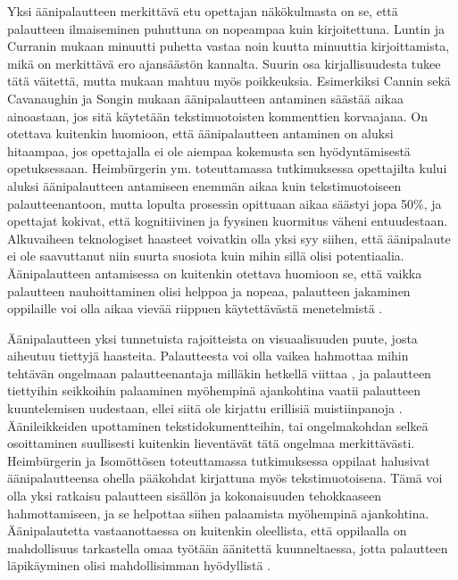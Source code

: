 \documentclass[utf8]{gradu3}
\begin{document}
Yksi äänipalautteen merkittävä etu opettajan näkökulmasta on se, että palautteen ilmaiseminen puhuttuna on nopeampaa kuin kirjoitettuna. Luntin ja Curranin \parencite*{areYouListening} mukaan minuutti puhetta vastaa noin kuutta minuuttia kirjoittamista, mikä on merkittävä ero ajansäästön kannalta. Suurin osa kirjallisuudesta tukee tätä väitettä, mutta mukaan mahtuu myös poikkeuksia. Esimerkiksi Cannin \parencite*{engaging} sekä Cavanaughin ja Songin \parencite*{versus} mukaan äänipalautteen antaminen säästää aikaa ainoastaan, jos sitä käytetään tekstimuotoisten kommenttien korvaajana. On otettava kuitenkin huomioon, että äänipalautteen antaminen on aluksi hitaampaa, jos opettajalla ei ole aiempaa kokemusta sen hyödyntämisestä opetuksessaan. Heimbürgerin ym. \parencite*{academics} toteuttamassa tutkimuksessa opettajilta kului aluksi äänipalautteen antamiseen enemmän aikaa kuin tekstimuotoiseen palautteenantoon, mutta lopulta prosessin opittuaan aikaa säästyi jopa 50\%, ja opettajat kokivat, että kognitiivinen ja fyysinen kuormitus väheni entuudestaan. Alkuvaiheen teknologiset haasteet voivatkin olla yksi syy siihen, että äänipalaute ei ole saavuttanut niin suurta suosiota kuin mihin sillä olisi potentiaalia. Äänipalautteen antamisessa on kuitenkin otettava huomioon se, että vaikka palautteen nauhoittaminen olisi helppoa ja nopeaa, palautteen jakaminen oppilaille voi olla aikaa vievää riippuen käytettävästä menetelmistä \parencite{engaging}.

Äänipalautteen yksi tunnetuista rajoitteista on visuaalisuuden puute, josta aiheutuu tiettyjä haasteita. Palautteesta voi olla vaikea hahmottaa mihin tehtävän ongelmaan palautteenantaja milläkin hetkellä viittaa \parencite{versus}, ja palautteen tiettyihin seikkoihin palaaminen myöhempinä ajankohtina vaatii palautteen kuuntelemisen uudestaan, ellei siitä ole kirjattu erillisiä muistiinpanoja \parencite{evaluating}. Äänileikkeiden upottaminen tekstidokumentteihin, tai ongelmakohdan selkeä osoittaminen suullisesti kuitenkin lieventävät tätä ongelmaa merkittävästi. Heimbürgerin ja Isomöttösen \parencite*{moderating} toteuttamassa tutkimuksessa oppilaat halusivat äänipalautteensa ohella pääkohdat kirjattuna myös tekstimuotoisena. Tämä voi olla yksi ratkaisu palautteen sisällön ja kokonaisuuden tehokkaaseen hahmottamiseen, ja se helpottaa siihen palaamista myöhempinä ajankohtina. Äänipalautetta vastaanottaessa on kuitenkin oleellista, että oppilaalla on mahdollisuus tarkastella omaa työtään äänitettä kuunneltaessa, jotta palautteen läpikäyminen olisi mahdollisimman hyödyllistä \parencite{usingAudio}.
\end{document}
